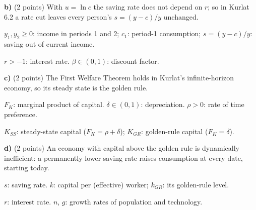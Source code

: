 \textbf{b)} (2 points) With $u=\ln c$ the saving rate does not depend on $r$; so in Kurlat 6.2 a rate cut leaves every person's
$s=(y-c)/y$ unchanged.
\begin{sol}
\begin{notacao}
\item $y_1,y_2\ge0$: income in periods 1 and 2; $c_1$: period-1 consumption; $s=(y-c)/y$: saving out of current income.
\item $r>-1$: interest rate. $\beta\in(0,1)$: discount factor.
\end{notacao}
\end{sol}

\textbf{c)} (2 points) The First Welfare Theorem holds in Kurlat's infinite-horizon economy, so its steady state is the golden rule.
\begin{sol}
\begin{notacao}
\item $F_K$: marginal product of capital. $\delta\in(0,1)$: depreciation. $\rho>0$: rate of time preference.
\item $K_{SS}$: steady-state capital ($F_K=\rho+\delta$); $K_{GR}$: golden-rule capital ($F_K=\delta$).
\end{notacao}
\end{sol}

\textbf{d)} (2 points) An economy with capital above the golden rule is dynamically inefficient: a permanently lower saving rate raises
consumption at every date, starting today.
\begin{sol}
\begin{notacao}
\item $s$: saving rate. $k$: capital per (effective) worker; $k_{GR}$: its golden-rule level.
\item $r$: interest rate. $n$, $g$: growth rates of population and technology.
\end{notacao}
\end{sol}


